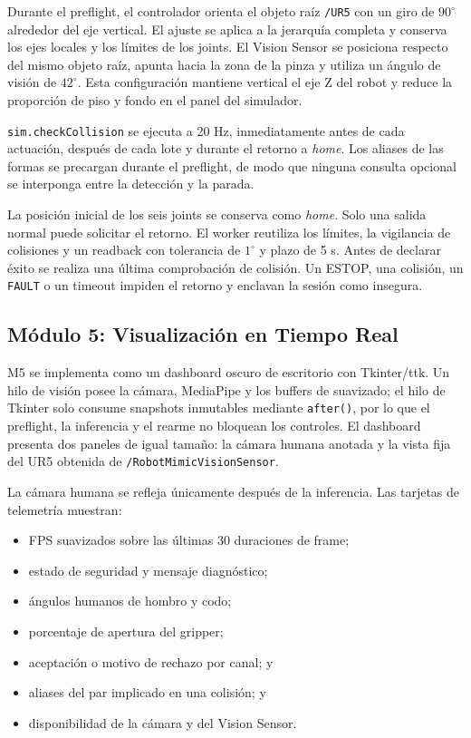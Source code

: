 Durante el preflight, el controlador orienta el objeto raíz \texttt{/UR5} con
un giro de $90^\circ$ alrededor del eje vertical. El ajuste se aplica a la
jerarquía completa y conserva los ejes locales y los límites de los joints. El
Vision Sensor se posiciona respecto del mismo objeto raíz, apunta hacia la
zona de la pinza y utiliza un ángulo de visión de $42^\circ$. Esta configuración
mantiene vertical el eje Z del robot y reduce la proporción de piso y fondo en
el panel del simulador.

\texttt{sim.checkCollision} se ejecuta a 20 Hz, inmediatamente antes de cada
actuación, después de cada lote y durante el retorno a \textit{home}. Los
aliases de las formas se precargan durante el preflight, de modo que ninguna
consulta opcional se interponga entre la detección y la parada.

La posición inicial de los seis joints se conserva como \textit{home}. Solo una
salida normal puede solicitar el retorno. El worker reutiliza los límites, la
vigilancia de colisiones y un readback con tolerancia de $1^\circ$ y plazo de
5 s. Antes de declarar éxito se realiza una última comprobación de colisión. Un
ESTOP, una colisión, un \texttt{FAULT} o un timeout impiden el retorno y
enclavan la sesión como insegura.

\subsection{Módulo 5: Visualización en Tiempo Real}
\label{subsec:implementacion_m5}

M5 se implementa como un dashboard oscuro de escritorio con Tkinter/ttk. Un
hilo de visión posee la cámara, MediaPipe y los buffers de suavizado; el hilo de
Tkinter solo consume snapshots inmutables mediante \texttt{after()}, por lo que
el preflight, la inferencia y el rearme no bloquean los controles. El dashboard
presenta dos paneles de igual tamaño: la cámara humana anotada y la vista fija
del UR5 obtenida de \texttt{/RobotMimicVisionSensor}.

La cámara humana se refleja únicamente después de la inferencia. Las tarjetas
de telemetría muestran:

\begin{itemize}
    \item FPS suavizados sobre las últimas 30 duraciones de frame;
    \item estado de seguridad y mensaje diagnóstico;
    \item ángulos humanos de hombro y codo;
    \item porcentaje de apertura del gripper;
    \item aceptación o motivo de rechazo por canal; y
    \item aliases del par implicado en una colisión; y
    \item disponibilidad de la cámara y del Vision Sensor.
\end{itemize}

